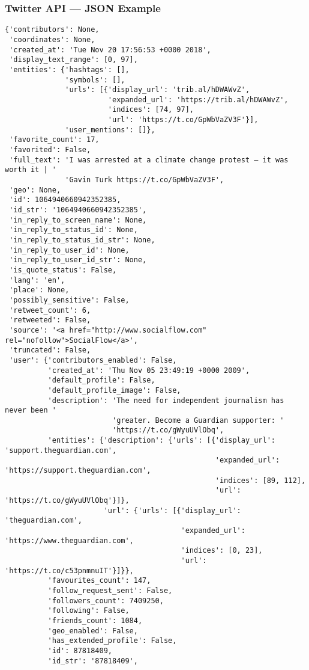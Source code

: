 \begin{frame}[fragile]
    \frametitle{Twitter API --- JSON Example}
\begin{verbatim}
{'contributors': None,
 'coordinates': None,
 'created_at': 'Tue Nov 20 17:56:53 +0000 2018',
 'display_text_range': [0, 97],
 'entities': {'hashtags': [],
              'symbols': [],
              'urls': [{'display_url': 'trib.al/hDWAWvZ',
                        'expanded_url': 'https://trib.al/hDWAWvZ',
                        'indices': [74, 97],
                        'url': 'https://t.co/GpWbVaZV3F'}],
              'user_mentions': []},
 'favorite_count': 17,
 'favorited': False,
 'full_text': 'I was arrested at a climate change protest – it was worth it | '
              'Gavin Turk https://t.co/GpWbVaZV3F',
 'geo': None,
 'id': 1064940660942352385,
 'id_str': '1064940660942352385',
 'in_reply_to_screen_name': None,
 'in_reply_to_status_id': None,
 'in_reply_to_status_id_str': None,
 'in_reply_to_user_id': None,
 'in_reply_to_user_id_str': None,
 'is_quote_status': False,
 'lang': 'en',
 'place': None,
 'possibly_sensitive': False,
 'retweet_count': 6,
 'retweeted': False,
 'source': '<a href="http://www.socialflow.com" rel="nofollow">SocialFlow</a>',
 'truncated': False,
 'user': {'contributors_enabled': False,
          'created_at': 'Thu Nov 05 23:49:19 +0000 2009',
          'default_profile': False,
          'default_profile_image': False,
          'description': 'The need for independent journalism has never been '
                         'greater. Become a Guardian supporter: '
                         'https://t.co/gWyuUVlObq',
          'entities': {'description': {'urls': [{'display_url': 'support.theguardian.com',
                                                 'expanded_url': 'https://support.theguardian.com',
                                                 'indices': [89, 112],
                                                 'url': 'https://t.co/gWyuUVlObq'}]},
                       'url': {'urls': [{'display_url': 'theguardian.com',
                                         'expanded_url': 'https://www.theguardian.com',
                                         'indices': [0, 23],
                                         'url': 'https://t.co/c53pnmnuIT'}]}},
          'favourites_count': 147,
          'follow_request_sent': False,
          'followers_count': 7409250,
          'following': False,
          'friends_count': 1084,
          'geo_enabled': False,
          'has_extended_profile': False,
          'id': 87818409,
          'id_str': '87818409',

\end{verbatim}
\end{frame}
